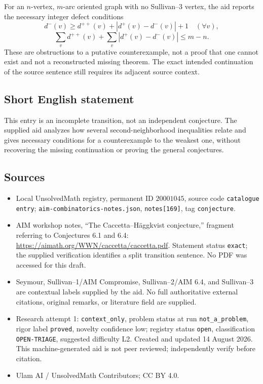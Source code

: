 \documentclass[11pt]{article}
\begin{document}
For an \(n\)-vertex, \(m\)-arc oriented graph with no Sullivan--3 vertex, the aid reports the necessary integer defect conditions
\[
 d^-(v)\ge d^{++}(v)+|d^+(v)-d^-(v)|+1\quad(\forall v),
\]
\[
 \sum_v d^{++}(v)+\sum_v|d^+(v)-d^-(v)|\le m-n.
\]
These are obstructions to a putative counterexample, not a proof that one cannot exist and not a reconstructed missing theorem. The exact intended continuation of the source sentence still requires its adjacent source context.
\subsection{Short English statement}
This entry is an incomplete transition, not an independent conjecture. The supplied aid analyzes how several second-neighborhood inequalities relate and gives necessary conditions for a counterexample to the weakest one, without recovering the missing continuation or proving the general conjectures.
\subsection{Sources}
\begin{itemize}
\item Local UnsolvedMath registry, permanent ID \(20001045\), source code \texttt{catalogue entry}; \texttt{aim-combinatorics-notes.json}, \texttt{notes[169]}, tag \texttt{conjecture}.
\item AIM workshop notes, ``The Caccetta--H\"aggkvist conjecture,'' fragment referring to Conjectures 6.1 and 6.4: \url{https://aimath.org/WWN/caccetta/caccetta.pdf}. Statement status \texttt{exact}; the supplied verification identifies a split transition sentence. No PDF was accessed for this draft.
\item Seymour, Sullivan--1/AIM Compromise, Sullivan--2/AIM 6.4, and Sullivan--3 are contextual labels supplied by the aid. No full authoritative external citations, original remarks, or literature field are supplied.
\item Research attempt 1: \texttt{context\_only}, problem status at run \texttt{not\_a\_problem}, rigor label \texttt{proved}, novelty confidence low; registry status \texttt{open}, classification \texttt{OPEN-TRIAGE}, suggested difficulty L2. Created and updated 14 August 2026. This machine-generated aid is not peer reviewed; independently verify before citation.
\item Ulam AI / UnsolvedMath Contributors; CC BY 4.0.
\end{itemize}
\end{document}
